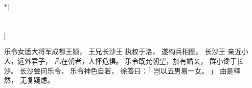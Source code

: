 
\switchcolumn[0]*[\section{}]

乐令女适大将军成都王颍，
王兄长沙王
执权于洛，
遂构兵相图。
长沙王
亲近小人，远外君子，
凡在朝者，人怀危惧。
乐令既允朝望，加有婚亲，
群小谗于长沙。
长沙尝问乐令，
乐令神色自若，
徐答曰：「
    岂以五男易一女。
」
由是释然，
无复疑虑。

\switchcolumn



